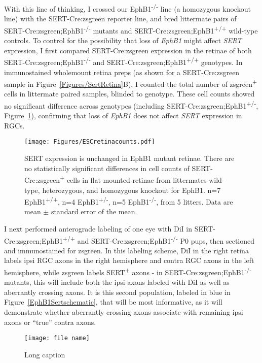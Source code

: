 With this line of thinking, I crossed our EphB1\textsuperscript{-/-} line (a homozygous knockout line) with the SERT-Cre:zsgreen reporter line, and bred littermate pairs of SERT-Cre:zsgreen;EphB1\textsuperscript{-/-} mutants and SERT-Cre:zsgreen;EphB1\textsuperscript{+/+} wild-type controls.
To control for the possibility that loss of \emph{EphB1} might affect \emph{SERT} expression, I first compared SERT-Cre:zsgreen expression in the retinae of both SERT-Cre:zsgreen;EphB1\textsuperscript{-/-} and SERT-Cre:zsgreen;EphB1\textsuperscript{+/+} genotypes.
In immunostained wholemount retina preps (as shown for a SERT-Cre:zsgreen sample in Figure~\ref{Figures/SertRetina}B), I counted the total number of zsgreen\textsuperscript{+} cells in littermate paired samples, blinded to genotype.
These cell counts showed no significant difference across genotypes (including SERT-Cre:zsgreen;EphB1\textsuperscript{+/-}, Figure~\ref{ESCretinacounts}), confirming that loss of \emph{EphB1} does not affect \emph{SERT} expression in RGCs.
\begin{figure}[hbtp]
    \begin{center}
        \texttt{[image: Figures/ESCretinacounts.pdf]}
        \caption[SERT expression is unchanged in EphB1 mutant retinae.]
        {SERT expression is unchanged in EphB1 mutant retinae.
		There are no statistically significant differences in cell counts of SERT-Cre:zsgreen\textsuperscript{+} cells in flat-mounted retinae from littermates wild-type, heterozygous, and homozygous knockout for EphB1.
		n=7 EphB1\textsuperscript{+/+}, n=4 EphB1\textsuperscript{+/-}, n=5 EphB1\textsuperscript{-/-}, from 5 litters.
		Data are mean $\pm$ standard error of the mean.
		}
        \label{ESCretinacounts}
    \end{center}
\end{figure}

I next performed anterograde labeling of one eye with DiI in SERT-Cre:zsgreen;EphB1\textsuperscript{+/+} and SERT-Cre:zsgreen;EphB1\textsuperscript{-/-} P0 pups, then sectioned and immunostained for zsgreen.
In this labeling scheme, DiI in the right retina labels ipsi RGC axons in the right hemisphere and contra RGC axons in the left hemisphere, while zsgreen labels SERT\textsuperscript{+} axons - in SERT-Cre:zsgreen;EphB1\textsuperscript{-/-} mutants, this will include both the ipsi axons labeled with DiI as well as aberrantly crossing axons.
It is this second population, labeled in blue in Figure~\ref{EphB1Sertschematic}, that will be most informative, as it will demonstrate whether aberrantly crossing axons associate with remaining ipsi axons or ``true'' contra axons.
\begin{figure}[hbtp]
    \begin{center}
        \texttt{[image: file name]}
        \caption[Short caption]
        {Long caption}
        \label{file name}
    \end{center}
\end{figure}
